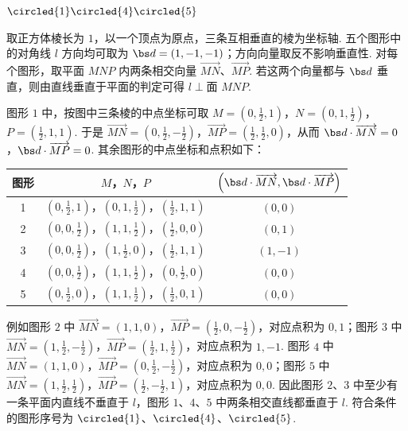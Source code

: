 \begin{answer}
\(\circled{1}\circled{4}\circled{5}\)
\end{answer}

\begin{solution}
取正方体棱长为 \(1\)，以一个顶点为原点，三条互相垂直的棱为坐标轴. 五个图形中的对角线 \(l\) 方向均可取为 \(\bs d=(1,-1,-1)\)；方向向量取反不影响垂直性. 对每个图形，取平面 \(MNP\) 内两条相交向量 \(\overrightarrow{MN}\)、\(\overrightarrow{MP}\). 若这两个向量都与 \(\bs d\) 垂直，则由直线垂直于平面的判定可得 \(l\perp\text{面 }MNP\).

图形 \(1\) 中，按图中三条棱的中点坐标可取
\(M=\left(0,\frac12,1\right)\)，\(N=\left(0,1,\frac12\right)\)，\(P=\left(\frac12,1,1\right)\).
于是 \(\overrightarrow{MN}=\left(0,\frac12,-\frac12\right)\)，\(\overrightarrow{MP}=\left(\frac12,\frac12,0\right)\)，从而
\(\bs d\cdot\overrightarrow{MN}=0\)，\(\bs d\cdot\overrightarrow{MP}=0\).
其余图形的中点坐标和点积如下：
\begin{center}
\begin{tabular}{c|c|c}
图形 & \(M\)，\(N\)，\(P\) & \(\left(\bs d\cdot\overrightarrow{MN},\bs d\cdot\overrightarrow{MP}\right)\)\\ \hline
1 & \(\left(0,\frac12,1\right)\)，\(\left(0,1,\frac12\right)\)，\(\left(\frac12,1,1\right)\) & \((0,0)\)\\
2 & \(\left(0,0,\frac12\right)\)，\(\left(1,1,\frac12\right)\)，\(\left(\frac12,0,0\right)\) & \((0,1)\)\\
3 & \(\left(0,0,\frac12\right)\)，\(\left(1,\frac12,0\right)\)，\(\left(\frac12,1,1\right)\) & \((1,-1)\)\\
4 & \(\left(0,0,\frac12\right)\)，\(\left(1,1,\frac12\right)\)，\(\left(0,\frac12,0\right)\) & \((0,0)\)\\
5 & \(\left(0,\frac12,0\right)\)，\(\left(1,1,\frac12\right)\)，\(\left(\frac12,0,1\right)\) & \((0,0)\)
\end{tabular}
\end{center}
例如图形 \(2\) 中 \(\overrightarrow{MN}=(1,1,0)\)，\(\overrightarrow{MP}=\left(\frac12,0,-\frac12\right)\)，对应点积为 \(0,1\)；图形 \(3\) 中 \(\overrightarrow{MN}=\left(1,\frac12,-\frac12\right)\)，\(\overrightarrow{MP}=\left(\frac12,1,\frac12\right)\)，对应点积为 \(1,-1\). 图形 \(4\) 中 \(\overrightarrow{MN}=(1,1,0)\)，\(\overrightarrow{MP}=\left(0,\frac12,-\frac12\right)\)，对应点积为 \(0,0\)；图形 \(5\) 中 \(\overrightarrow{MN}=\left(1,\frac12,\frac12\right)\)，\(\overrightarrow{MP}=\left(\frac12,-\frac12,1\right)\)，对应点积为 \(0,0\). 因此图形 \(2\)、\(3\) 中至少有一条平面内直线不垂直于 \(l\)，图形 \(1\)、\(4\)、\(5\) 中两条相交直线都垂直于 \(l\). 符合条件的图形序号为 \(\circled{1}\)、\(\circled{4}\)、\(\circled{5}\).
\end{solution}

